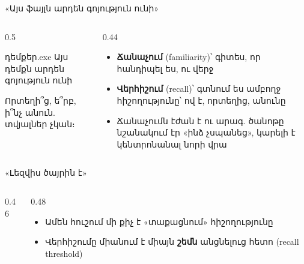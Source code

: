\begin{frame}{«Այս ֆայլն արդեն գոյություն ունի»}
  \begin{columns}[c]
    \begin{column}{0.5\textwidth}
      \begin{popup}{դեմքեր.exe}
        {\blackfont Այս դեմքն արդեն գոյություն ունի}\par\smallskip
        Որտեղի՞ց, ե՞րբ, ի՞նչ անուն. տվյալներ չկան։
      \end{popup}
    \end{column}
    \begin{column}{0.44\textwidth}
      \begin{itemize}
        \item<2-> \textbf{Ճանաչում} (familiarity)՝ գիտես, որ հանդիպել ես, ու վերջ
        \item<3-> \textbf{Վերհիշում} (recall)՝ գտնում ես ամբողջ հիշողությունը՝ ով է, որտեղից, անունը
        \item<4-> Ճանաչումն էժան է ու արագ. ծանոթը նշանակում էր «ինձ չսպանեց», կարելի է կենտրոնանալ նորի վրա
      \end{itemize}
    \end{column}
  \end{columns}
\end{frame}

\begin{frame}{«Լեզվիս ծայրին է»}
  \begin{columns}[c]
    \begin{column}{0.46\textwidth}
      \centering
    \end{column}
    \begin{column}{0.48\textwidth}
      \begin{itemize}
        \item Ամեն հուշում մի քիչ է «տաքացնում» հիշողությունը
        \item Վերհիշումը միանում է միայն \textbf{շեմն} անցնելուց հետո (recall threshold)
      \end{itemize}
    \end{column}
  \end{columns}
\end{frame}

